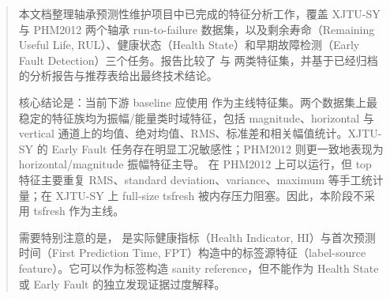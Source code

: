 \begin{abstract}
本文档整理轴承预测性维护项目中已完成的特征分析工作，覆盖 XJTU-SY 与 PHM2012 两个轴承 run-to-failure 数据集，以及剩余寿命（Remaining Useful Life, RUL）、健康状态（Health State）和早期故障检测（Early Fault Detection）三个任务。报告比较了  与  两类特征集，并基于已经归档的分析报告与推荐表给出最终技术结论\cite{feature_analysis_report,recommended_features,final_feature_decisions}。

核心结论是：当前下游 baseline 应使用  作为主线特征集。两个数据集上最稳定的特征族均为振幅/能量类时域特征，包括 magnitude、horizontal 与 vertical 通道上的均值、绝对均值、RMS、标准差和相关幅值统计。XJTU-SY 的 Early Fault 任务存在明显工况敏感性；PHM2012 则更一致地表现为 horizontal/magnitude 振幅特征主导。 在 PHM2012 上可以运行，但 top  特征主要重复 RMS、standard deviation、variance、maximum 等手工统计量；在 XJTU-SY 上 full-size tsfresh 被内存压力阻塞。因此，本阶段不采用 tsfresh 作为主线。

需要特别注意的是， 是实际健康指标（Health Indicator, HI）与首次预测时间（First Prediction Time, FPT）构造中的标签源特征（label-source feature）。它可以作为标签构造 sanity reference，但不能作为 Health State 或 Early Fault 的独立发现证据过度解释。
\end{abstract}
